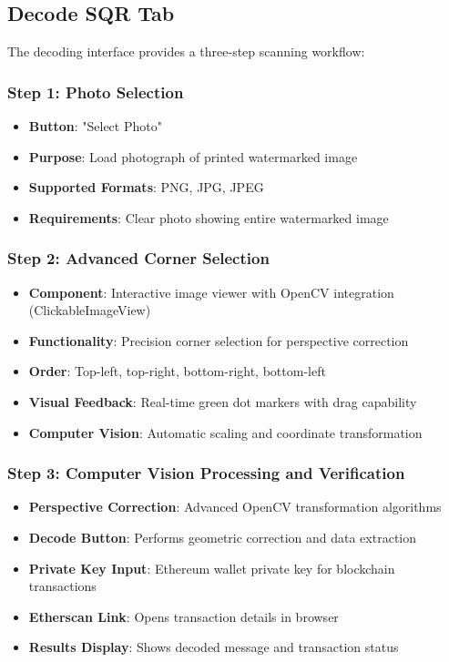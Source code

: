 \documentclass[12pt,a4paper]{article}
\begin{document}
\subsection{Decode SQR Tab}

The decoding interface provides a three-step scanning workflow:

\subsubsection{Step 1: Photo Selection}
\begin{itemize}
    \item \textbf{Button}: "Select Photo"
    \item \textbf{Purpose}: Load photograph of printed watermarked image
    \item \textbf{Supported Formats}: PNG, JPG, JPEG
    \item \textbf{Requirements}: Clear photo showing entire watermarked image
\end{itemize}

\subsubsection{Step 2: Advanced Corner Selection}
\begin{itemize}
    \item \textbf{Component}: Interactive image viewer with OpenCV integration (ClickableImageView)
    \item \textbf{Functionality}: Precision corner selection for perspective correction
    \item \textbf{Order}: Top-left, top-right, bottom-right, bottom-left
    \item \textbf{Visual Feedback}: Real-time green dot markers with drag capability
    \item \textbf{Computer Vision}: Automatic scaling and coordinate transformation
\end{itemize}

\subsubsection{Step 3: Computer Vision Processing and Verification}
\begin{itemize}
    \item \textbf{Perspective Correction}: Advanced OpenCV transformation algorithms
    \item \textbf{Decode Button}: Performs geometric correction and data extraction
    \item \textbf{Private Key Input}: Ethereum wallet private key for blockchain transactions
    \item \textbf{Etherscan Link}: Opens transaction details in browser
    \item \textbf{Results Display}: Shows decoded message and transaction status
\end{itemize}
\end{document}
